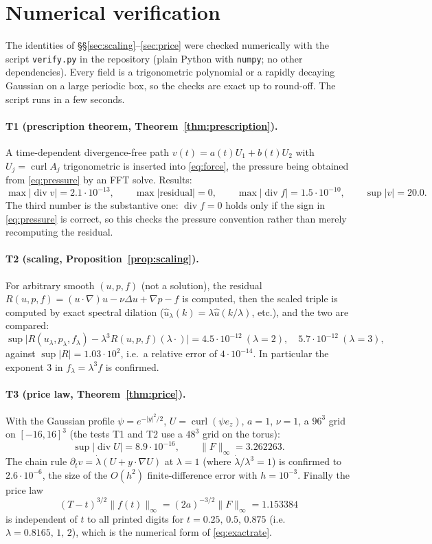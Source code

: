 \documentclass[11pt]{article}
\theoremstyle{remark}
\newcommand{\norm}[1]{\lVert #1\rVert}
\newcommand{\abs}[1]{\lvert #1\rvert}
\newcommand{\Div}{\operatorname{div}}
\newcommand{\curl}{\operatorname{curl}}
\begin{document}
\section{Numerical verification}\label{app:num}

The identities of \S\S\ref{sec:scaling}--\ref{sec:price} were checked numerically with the
script \texttt{verify.py} in the repository (plain Python with \texttt{numpy}; no other
dependencies). Every field is a trigonometric polynomial or a rapidly decaying Gaussian on a
large periodic box, so the checks are exact up to round-off. The script runs in a few seconds.

\paragraph{T1 (prescription theorem, Theorem~\ref{thm:prescription}).}
A time-dependent divergence-free path $v(t)=a(t)U_1+b(t)U_2$ with $U_j=\curl A_j$ trigonometric
is inserted into \eqref{eq:force}, the pressure being obtained from \eqref{eq:pressure} by an
FFT solve. Results:
\[
\max\abs{\Div v}=2.1\cdot10^{-13},\qquad
\max\abs{\text{residual}}=0,\qquad
\max\abs{\Div f}=1.5\cdot10^{-10},\qquad
\sup\abs{v}=20.0 .
\]
The third number is the substantive one: $\Div f=0$ holds only if the sign in
\eqref{eq:pressure} is correct, so this checks the pressure convention rather than merely
recomputing the residual.

\paragraph{T2 (scaling, Proposition~\ref{prop:scaling}).}
For arbitrary smooth $(u,p,f)$ (not a solution), the residual
$R(u,p,f)=(u\cdot\nabla)u-\nu\Delta u+\nabla p-f$ is computed, then the scaled triple is
computed by exact spectral dilation ($\hat u_\lambda(k)=\lambda\hat u(k/\lambda)$, etc.), and
the two are compared:
\[
\sup\abs{R(u_\lambda,p_\lambda,f_\lambda)-\lambda^3R(u,p,f)(\lambda\cdot)}
=4.5\cdot10^{-12}\ (\lambda=2),\quad
5.7\cdot10^{-12}\ (\lambda=3),
\]
against $\sup\abs{R}=1.03\cdot10^{2}$, i.e.\ a relative error of $4\cdot10^{-14}$. In
particular the exponent $3$ in $f_\lambda=\lambda^3f$ is confirmed.

\paragraph{T3 (price law, Theorem~\ref{thm:price}).}
With the Gaussian profile $\psi=e^{-\abs{y}^2/2}$, $U=\curl(\psi e_z)$, $a=1$, $\nu=1$, a
$96^3$ grid on $[-16,16]^3$ (the tests T1 and T2 use a $48^3$ grid on the torus):
\[
\sup\abs{\Div U}=8.9\cdot10^{-16},\qquad
\norm{F}_{\infty}=3.262263 .
\]
The chain rule $\partial_tv=\dot\lambda(U+y\cdot\nabla U)$ at $\lambda=1$ (where
$\dot\lambda/\lambda^3=1$) is confirmed to $2.6\cdot10^{-6}$, the size of the $O(h^2)$
finite-difference error with $h=10^{-3}$. Finally the price law
\begin{equation}\label{eq:numerics}
(T-t)^{3/2}\norm{f(t)}_{\infty}=(2a)^{-3/2}\norm{F}_{\infty}=1.153384
\end{equation}
is independent of $t$ to all printed digits for $t=0.25,\,0.5,\,0.875$ (i.e.\
$\lambda=0.8165,\,1,\,2$), which is the numerical form of \eqref{eq:exactrate}.
\end{document}
